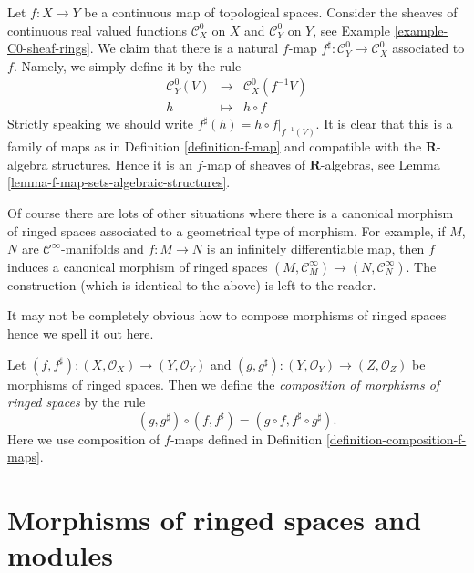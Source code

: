 \begin{example}
\label{example-continuous-map-ringed}
Let $f : X \to Y$ be a continuous map of topological spaces.
Consider the sheaves of continuous real valued functions
$\mathcal{C}^0_X$ on $X$ and $\mathcal{C}^0_Y$ on $Y$,
see Example \ref{example-C0-sheaf-rings}. We claim that there
is a natural $f$-map $f^\sharp : \mathcal{C}^0_Y \to \mathcal{C}^0_X$
associated to $f$. Namely, we simply define it by the
rule
\begin{eqnarray*}
\mathcal{C}^0_Y(V) & \longrightarrow & \mathcal{C}^0_X(f^{-1}V) \\
h & \longmapsto & h \circ f
\end{eqnarray*}
Strictly speaking we should write $f^\sharp(h) = h \circ f|_{f^{-1}(V)}$.
It is clear that this is a family of maps as in
Definition \ref{definition-f-map} and compatible with the $\mathbf{R}$-algebra
structures. Hence it is an $f$-map of sheaves of $\mathbf{R}$-algebras, see
Lemma \ref{lemma-f-map-sets-algebraic-structures}.

\medskip\noindent
Of course there are lots of other situations where there is
a canonical morphism of ringed spaces associated to a geometrical
type of morphism. For example, if $M$, $N$ are $\mathcal{C}^\infty$-manifolds
and $f : M \to N$ is an infinitely differentiable map, then
$f$ induces a canonical morphism of ringed spaces
$(M, \mathcal{C}_M^\infty) \to (N, \mathcal{C}^\infty_N)$.
The construction (which is identical to the above) is left
to the reader.
\end{example}

\noindent
It may not be completely obvious how to compose morphisms of
ringed spaces hence we spell it out here.

\begin{definition}
\label{definition-composition-maps-ringed-spaces}
Let
$(f, f^\sharp) : (X, \mathcal{O}_X) \to (Y, \mathcal{O}_Y)$ and
$(g, g^\sharp) : (Y, \mathcal{O}_Y) \to (Z, \mathcal{O}_Z)$
be morphisms of ringed spaces. Then we define
the {\it composition of morphisms of ringed spaces}
by the rule
$$
(g, g^\sharp) \circ (f, f^\sharp) = (g \circ f, f^\sharp \circ g^\sharp).
$$
Here we use composition of $f$-maps defined in
Definition \ref{definition-composition-f-maps}.
\end{definition}


\section{Morphisms of ringed spaces and modules}
\label{section-ringed-spaces-functoriality-modules}


